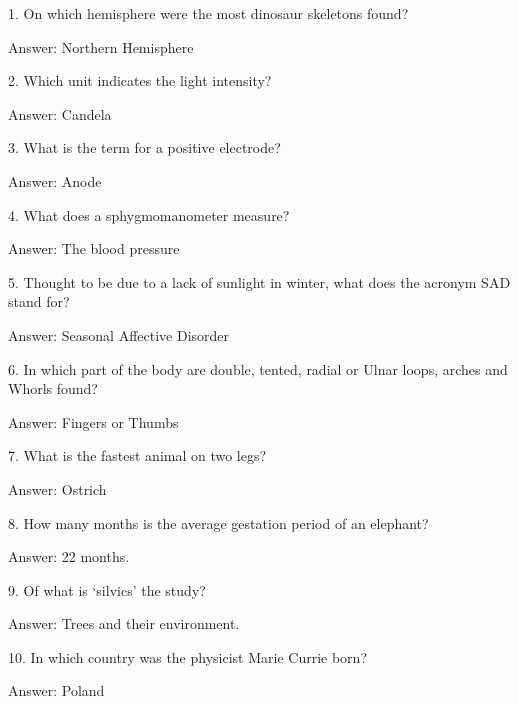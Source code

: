 \documentclass{beamer}
\begin{document}
    \begin{frame}
        1. On which hemisphere were the most dinosaur skeletons found?

        Answer: Northern Hemisphere
    \end{frame}

    \begin{frame}
        2. Which unit indicates the light intensity?

        Answer: Candela
    \end{frame}

    \begin{frame}
        3. What is the term for a positive electrode?

        Answer: Anode
    \end{frame}

    \begin{frame}
        4. What does a sphygmomanometer measure?

        Answer: The blood pressure
    \end{frame}

    \begin{frame}
        5. Thought to be due to a lack of sunlight in winter, what does the
        acronym SAD stand for?

        Answer: Seasonal Affective Disorder
    \end{frame}

    \begin{frame}
        6. In which part of the body are double, tented, radial or Ulnar loops,
        arches and Whorls found?

        Answer: Fingers or Thumbs
    \end{frame}

    \begin{frame}
        7. What is the fastest animal on two legs?

        Answer: Ostrich
    \end{frame}

    \begin{frame}
        8. How many months is the average gestation period of an elephant?

        Answer: 22 months.
    \end{frame}

    \begin{frame}
        9.  Of what is `silvics' the study?

        Answer: Trees and their environment.
    \end{frame}

    \begin{frame}
        10. In which country was the physicist Marie Currie born?

        Answer: Poland
    \end{frame}
\end{document}
